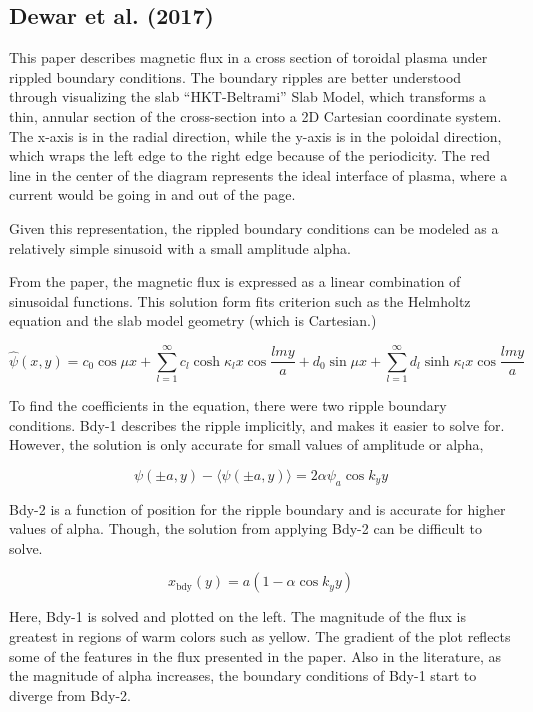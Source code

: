 \documentclass[../main.tex]{subfiles}
\begin{document}
\subsection{Dewar et al. (2017)}
This paper describes magnetic flux in a cross section of toroidal plasma under rippled boundary conditions. The boundary ripples are better understood through visualizing the slab “HKT-Beltrami” Slab Model, which transforms a thin, annular section of the cross-section into a 2D Cartesian coordinate system. The x-axis is in the radial direction, while the y-axis is in the poloidal direction, which wraps the left edge to the right edge because of the periodicity. The red line in the center of the diagram represents the ideal interface of plasma, where a current would be going in and out of the page.

Given this representation, the rippled boundary conditions can be modeled as a relatively simple sinusoid with a small amplitude alpha.

From the paper, the magnetic flux is expressed as a linear combination of sinusoidal functions. This solution form fits criterion such as the Helmholtz equation and the slab model geometry (which is Cartesian.)

\begin{equation}
    \hat{\psi}(x,y)=c_0 \cos{\mu x} + \sum_{l=1}^{\infty}c_l\cosh{\kappa_l x}\cos{\frac{lmy}{a}}+d_0\sin{\mu x}+\sum_{l=1}^{\infty}d_l\sinh{\kappa_l} x\cos{\frac{lmy}{a}}
\end{equation} 

To find the coefficients in the equation, there were two ripple boundary conditions. Bdy-1 describes the ripple implicitly, and makes it easier to solve for. However, the solution is only accurate for small values of amplitude or alpha,

\begin{equation}
    \psi\left( \pm a, y \right) - \langle \psi\left( \pm a, y \right) \rangle = 2\alpha \psi_a \cos{k_y y}
\end{equation} 

Bdy-2 is a function of position for the ripple boundary and is accurate for higher values of alpha. Though, the solution from applying Bdy-2 can be difficult to solve.

\begin{equation}
    x_{\text{bdy}}\left( y \right) =a\left( 1-\alpha\cos{k_y y} \right) 
\end{equation} 

Here, Bdy-1 is solved and plotted on the left. The magnitude of the flux is greatest in regions of warm colors such as yellow. The gradient of the plot reflects some of the features in the flux presented in the paper. Also in the literature, as the magnitude of alpha increases, the boundary conditions of Bdy-1 start to diverge from Bdy-2.
\end{document}
